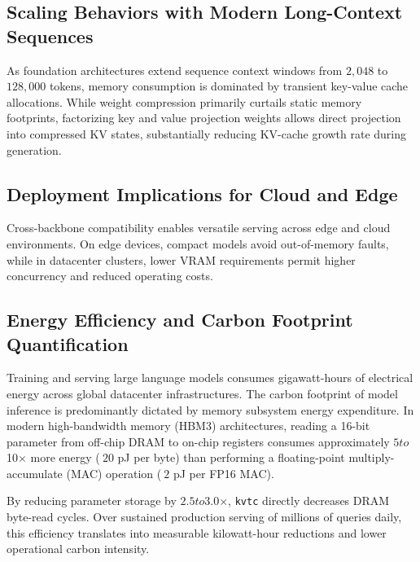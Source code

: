 \subsection{Scaling Behaviors with Modern Long-Context Sequences}
As foundation architectures extend sequence context windows from $2{,}048$ to $128{,}000$ tokens, memory consumption is dominated by transient key-value cache allocations. While weight compression primarily curtails static memory footprints, factorizing key and value projection weights allows direct projection into compressed KV states, substantially reducing KV-cache growth rate during generation.

\subsection{Deployment Implications for Cloud and Edge}
Cross-backbone compatibility enables versatile serving across edge and cloud environments. On edge devices, compact models avoid out-of-memory faults, while in datacenter clusters, lower VRAM requirements permit higher concurrency and reduced operating costs.

\subsection{Energy Efficiency and Carbon Footprint Quantification}
Training and serving large language models consumes gigawatt-hours of electrical energy across global datacenter infrastructures. The carbon footprint of model inference is predominantly dictated by memory subsystem energy expenditure. In modern high-bandwidth memory (HBM3) architectures, reading a 16-bit parameter from off-chip DRAM to on-chip registers consumes approximately $5$\times$ to $10$\times$ more energy ($~20$ pJ per byte) than performing a floating-point multiply-accumulate (MAC) operation ($~2$ pJ per FP16 MAC).

By reducing parameter storage by $2.5$\times$ to $3.0$\times$, \texttt{kvtc} directly decreases DRAM byte-read cycles. Over sustained production serving of millions of queries daily, this efficiency translates into measurable kilowatt-hour reductions and lower operational carbon intensity.
